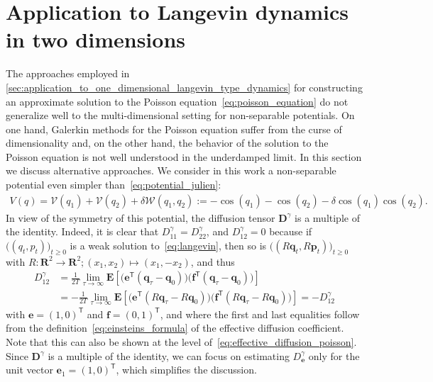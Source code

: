 \documentclass[11pt,a4paper]{article}
\newcommand{\expect}[0]{\mathbf{E}}
\newcommand{\real}{\mathbf R}
\newcommand{\vect}[1]{\boldsymbol{\mathbf #1}}
\newcommand{\mat}[1]{\vect #1}
\renewcommand{\t}{\mathsf T}
\theoremstyle{plain}
\numberwithin{equation}{section}
\renewcommand{\geq}{\geqslant}
\begin{document}
\section{Application to Langevin dynamics in two dimensions}%
\label{sec:applications_2d}%
The approaches employed in \cref{sec:application_to_one_dimensional_langevin_type_dynamics} for constructing an approximate solution to the Poisson equation~\eqref{eq:poisson_equation}
do not generalize well to the multi-dimensional setting for non-separable potentials.
On one hand, Galerkin methods for the Poisson equation suffer from the curse of dimensionality and,
on the other hand, the behavior of the solution to the Poisson equation is not well understood in the underdamped limit.
In this section we discuss alternative approaches.
We consider in this work a non-separable potential even simpler than~\eqref{eq:potential_julien}:
\begin{align}
    \label{eq:potential_simple}
    V(q) =  \mathcal V(q_1) + \mathcal V(q_2) + \delta \mathcal W(q_1, q_2) := - \cos(q_1) - \cos(q_2) - \delta \cos(q_1) \cos(q_2).
\end{align}
In view of the symmetry of this potential,
the diffusion tensor $\mat D^{\gamma}$ is a multiple of the identity.
Indeed, it is clear that $D^{\gamma}_{11} = D^{\gamma}_{22}$,
and $D^{\gamma}_{12} = 0$ because if $\bigl((q_t, p_t)\bigr)_{t \geq 0}$ is a weak solution to~\eqref{eq:langevin},
then so is $\bigl((R \vect q_t, R \vect p_t)\bigr)_{t \geq 0}$ with $R: \real^2 \to \real^2; (x_1, x_2) \mapsto (x_1, -x_2)$,
and thus
\begin{align*}
    D^{\gamma}_{12}
    &= \frac{1}{2T} \lim_{\tau \to \infty}
    \expect \left[ \bigl(\vect e^\t (\vect q_{\tau} - \vect q_0)\bigr) \bigl(\vect f^\t (\vect q_{\tau} - \vect q_0)\bigr) \right] \\
    &= - \frac{1}{2T} \lim_{\tau \to \infty}
    \expect \left[ \bigl(\vect e^\t (R \vect q_{\tau} - R \vect q_0)\bigr) \bigl(\vect f^\t (R \vect q_{\tau} - R \vect q_0)\bigr) \right]
    = - D^{\gamma}_{12}
\end{align*}
with $\vect e = (1, 0)^\t$ and $\vect f = (0, 1)^\t$,
and where the first and last equalities follow from the definition~\eqref{eq:einsteins_formula} of the effective diffusion coefficient.
Note that this can also be shown at the level of~\eqref{eq:effective_diffusion_poisson}.
Since $\mat D^{\gamma}$ is a multiple of the identity,
we can focus on estimating $D^{\gamma}_{\vect e}$ only for the unit vector $\vect e_1 = (1, 0)^\t$,
which simplifies the discussion.
\end{document}
